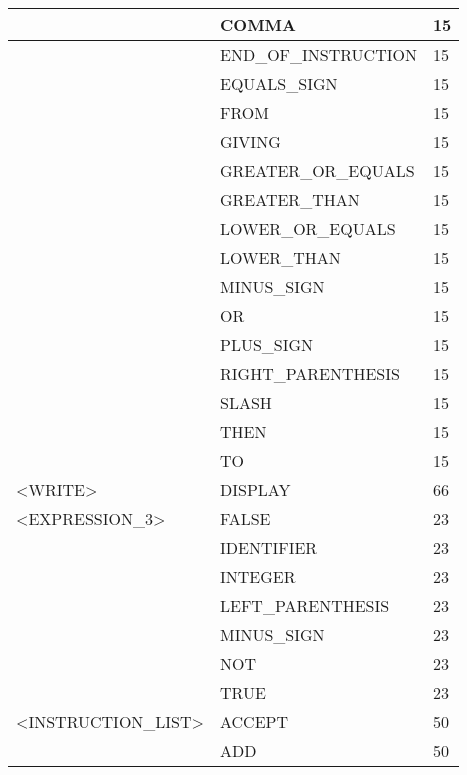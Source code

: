 \begin{longtable}{|l|l|l|}
                     &   COMMA                &   15 \\ \hline
                     &   END\_OF\_INSTRUCTION   &   15 \\ \hline
                     &   EQUALS\_SIGN          &   15 \\ \hline
                     &   FROM                 &   15 \\ \hline
                     &   GIVING               &   15 \\ \hline
                     &   GREATER\_OR\_EQUALS    &   15 \\ \hline
                     &   GREATER\_THAN         &   15 \\ \hline
                     &   LOWER\_OR\_EQUALS      &   15 \\ \hline
                     &   LOWER\_THAN           &   15 \\ \hline
                     &   MINUS\_SIGN           &   15 \\ \hline
                     &   OR                   &   15 \\ \hline
                     &   PLUS\_SIGN            &   15 \\ \hline
                     &   RIGHT\_PARENTHESIS    &   15 \\ \hline
                     &   SLASH                &   15 \\ \hline
                     &   THEN                 &   15 \\ \hline
                     &   TO                   &   15 \\ \hline
<WRITE>              &   DISPLAY              &   66 \\ \hline
<EXPRESSION\_3>       &   FALSE                &   23 \\ \hline
                     &   IDENTIFIER           &   23 \\ \hline
                     &   INTEGER              &   23 \\ \hline
                     &   LEFT\_PARENTHESIS     &   23 \\ \hline
                     &   MINUS\_SIGN           &   23 \\ \hline
                     &   NOT                  &   23 \\ \hline
                     &   TRUE                 &   23 \\ \hline
<INSTRUCTION\_LIST>   &   ACCEPT               &   50 \\ \hline
                     &   ADD                  &   50 \\ \hline

\end{longtable}
